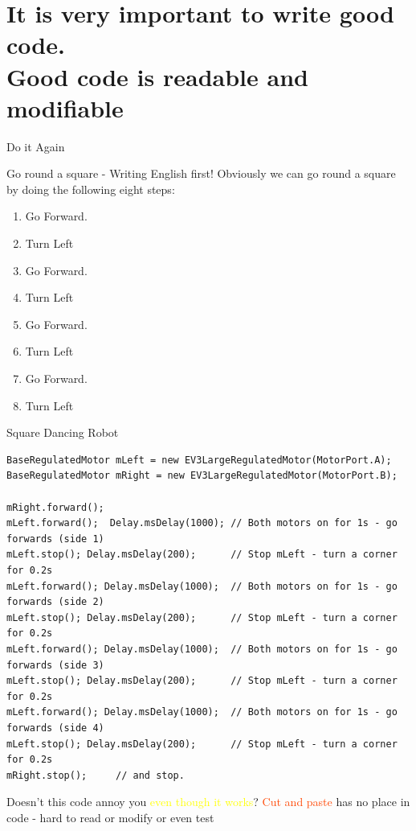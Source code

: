 \documentclass[color=pdftex,usenames,dvipsnames, aspectratio=169]{beamer}
\begin{document}
\section{It is very important to write good code.\\Good code is readable and modifiable}
\begin{frame}{Do it Again}
\begin{block}{Go round a square - Writing English first!}
Obviously we can go round a square by doing the following eight steps:
\begin{enumerate}
 \item Go Forward.
 \item Turn Left
 \item Go Forward.
 \item Turn Left
 \item Go Forward.
 \item Turn Left
 \item Go Forward.
 \item Turn Left
\end{enumerate}

\end{block}
\end{frame}

\begin{frame}[fragile, label=square]{Square Dancing Robot}

{
\lstset{xleftmargin=0in, xrightmargin=0in, framexleftmargin=0in}
\begin{lstlisting}[basicstyle=\ttfamily\scriptsize\color{blue}]
BaseRegulatedMotor mLeft = new EV3LargeRegulatedMotor(MotorPort.A);
BaseRegulatedMotor mRight = new EV3LargeRegulatedMotor(MotorPort.B);

mRight.forward(); 
mLeft.forward();  Delay.msDelay(1000); // Both motors on for 1s - go forwards (side 1)
mLeft.stop(); Delay.msDelay(200);      // Stop mLeft - turn a corner for 0.2s
mLeft.forward(); Delay.msDelay(1000);  // Both motors on for 1s - go forwards (side 2)
mLeft.stop(); Delay.msDelay(200);      // Stop mLeft - turn a corner for 0.2s
mLeft.forward(); Delay.msDelay(1000);  // Both motors on for 1s - go forwards (side 3)
mLeft.stop(); Delay.msDelay(200);      // Stop mLeft - turn a corner for 0.2s
mLeft.forward(); Delay.msDelay(1000);  // Both motors on for 1s - go forwards (side 4)
mLeft.stop(); Delay.msDelay(200);      // Stop mLeft - turn a corner for 0.2s
mRight.stop();     // and stop.
\end{lstlisting}
}

\begin{block}{Doesn't this code annoy you \textcolor{yellow}{even though it works}?}
\textcolor{OrangeRed}{Cut and paste} has no place in code - hard to read or modify or even test
\end{block}
\end{frame}
\end{document}
